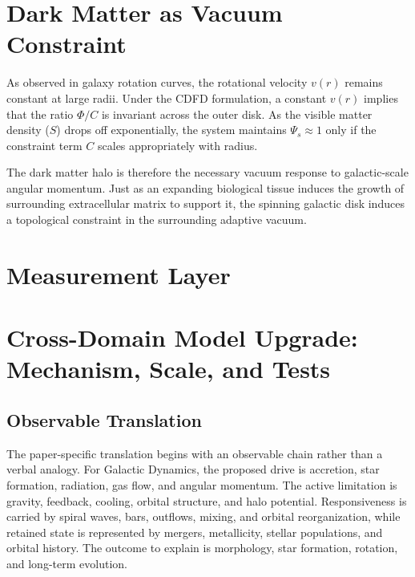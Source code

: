 \documentclass[11pt,a4paper]{article}
\begin{document}
\section{Dark Matter as Vacuum Constraint}
As observed in galaxy rotation curves, the rotational velocity $v(r)$ remains constant at large radii. Under the CDFD formulation, a constant $v(r)$ implies that the ratio $\Phi/C$ is invariant across the outer disk. As the visible matter density ($S$) drops off exponentially, the system maintains $\Psi_s \approx 1$ only if the constraint term $C$ scales appropriately with radius.

The dark matter halo is therefore the necessary vacuum response to galactic-scale angular momentum. Just as an expanding biological tissue induces the growth of surrounding extracellular matrix to support it, the spinning galactic disk induces a topological constraint in the surrounding adaptive vacuum.



\section{Measurement Layer}

\section{Cross-Domain Model Upgrade: Mechanism, Scale, and Tests}

\subsection{Observable Translation}

The paper-specific translation begins with an observable chain rather than a
verbal analogy. For Galactic Dynamics, the proposed drive is accretion, star formation, radiation, gas flow, and angular momentum.
The active limitation is gravity, feedback, cooling, orbital structure, and halo potential. Responsiveness is carried by
spiral waves, bars, outflows, mixing, and orbital reorganization, while retained state is represented by
mergers, metallicity, stellar populations, and orbital history. The outcome to explain is morphology, star formation, rotation, and long-term evolution.
\end{document}
